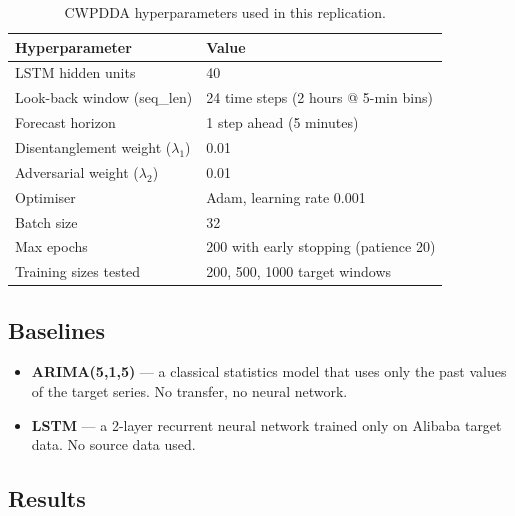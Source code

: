 \documentclass[12pt,a4paper]{article}
\begin{document}
\begin{table}[H]
\centering
\small
\caption{CWPDDA hyperparameters used in this replication.}
\begin{tabular}{@{}ll@{}}
\toprule
\textbf{Hyperparameter} & \textbf{Value} \\
\midrule
LSTM hidden units & 40 \\
Look-back window (seq\_len) & 24 time steps (2 hours @ 5-min bins) \\
Forecast horizon & 1 step ahead (5 minutes) \\
Disentanglement weight ($\lambda_1$) & 0.01 \\
Adversarial weight ($\lambda_2$) & 0.01 \\
Optimiser & Adam, learning rate 0.001 \\
Batch size & 32 \\
Max epochs & 200 with early stopping (patience 20) \\
Training sizes tested & 200, 500, 1000 target windows \\
\bottomrule
\end{tabular}
\end{table}

\subsection{Baselines}

\begin{itemize}
  \item \textbf{ARIMA(5,1,5)} --- a classical statistics model that uses only
        the past values of the target series. No transfer, no neural network.
  \item \textbf{LSTM} --- a 2-layer recurrent neural network trained only on
        Alibaba target data. No source data used.
\end{itemize}

\subsection{Results}
\end{document}
